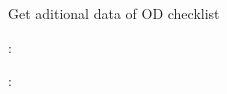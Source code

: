 \documentclass[letterpaper,10pt,english,openany,oneside]{sphinxmanual}
\begin{document}
\begin{fulllineitems}
\label{\detokenize{api-checklist/v1:post--api-checklist-v1-od-misdata}}
\sphinxAtStartPar
Get aditional data of OD checklist

\sphinxAtStartPar
{}:

\begin{sphinxVerbatim}[commandchars=\\\{\}]
   
   
\end{sphinxVerbatim}

\sphinxAtStartPar
{}:


\end{fulllineitems}
\end{document}
